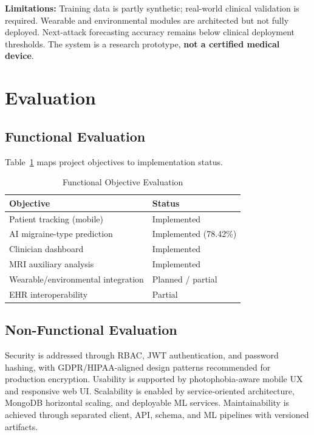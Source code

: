 \documentclass[conference,twocolumn,letterpaper]{IEEEtran}
\begin{document}
\textbf{Limitations:} Training data is partly synthetic; real-world clinical validation is required. Wearable and environmental modules are architected but not fully deployed. Next-attack forecasting accuracy remains below clinical deployment thresholds. The system is a research prototype, \textbf{not a certified medical device}.

\section{Evaluation}

\subsection{Functional Evaluation}
Table~\ref{tab:functional} maps project objectives to implementation status.

\begin{table}[htbp]
\caption{Functional Objective Evaluation}
\label{tab:functional}
\centering
\begin{tabular}{@{}p{}p{}@{}}
\toprule
\textbf{Objective} & \textbf{Status} \\
\midrule
Patient tracking (mobile) & Implemented \\
AI migraine-type prediction & Implemented (78.42\%) \\
Clinician dashboard & Implemented \\
MRI auxiliary analysis & Implemented \\
Wearable/environmental integration & Planned / partial \\
EHR interoperability & Partial \\
\bottomrule
\end{tabular}
\end{table}

\subsection{Non-Functional Evaluation}
Security is addressed through RBAC, JWT authentication, and password hashing, with GDPR/HIPAA-aligned design patterns recommended for production encryption. Usability is supported by photophobia-aware mobile UX and responsive web UI. Scalability is enabled by service-oriented architecture, MongoDB horizontal scaling, and deployable ML services. Maintainability is achieved through separated client, API, schema, and ML pipelines with versioned artifacts.
\end{document}

